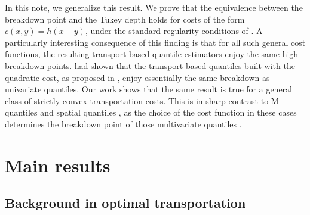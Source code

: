\documentclass[11pt]{article}
\theoremstyle{plain}
\theoremstyle{definition}\newtheorem{definition}[theorem]{Definition}
\theoremstyle{remark}
\begin{document}
In this note, we generalize this result. We prove that the equivalence between the breakdown point and the Tukey depth holds for costs of the form \( c(x,y) = h(x-y) \), under the standard regularity conditions of \cite{GangboMcCann.96}. %
A particularly interesting consequence of this finding is that  for all such general cost functions, the resulting transport-based quantile estimators enjoy the same high breakdown points. \cite{Avella-Gonzalez.25,paindaveine:passeggeri2024} had shown that the transport-based quantiles built with the quadratic cost, as proposed in \cite{HallinDelBarrioCuestaAlbertosMatran.21, ghosal:sen2022}, enjoy essentially the same breakdown as univariate quantiles. Our work shows that the same result is true for a general class of strictly convex transportation costs. This is in sharp contrast to M-quantiles \citep{breckling:chambers1988} and  spatial quantiles \citep{chaudhuri1996,dudley:koltchinskii1992}, as the choice of the cost function in these cases  determines the breakdown point  of those multivariate quantiles \citep{konen:paindavein2025,konen:paindaveine2026}. 





 

 





 
 
 \section{Main results}
 \subsection{Background in optimal transportation}
 
\end{document}
